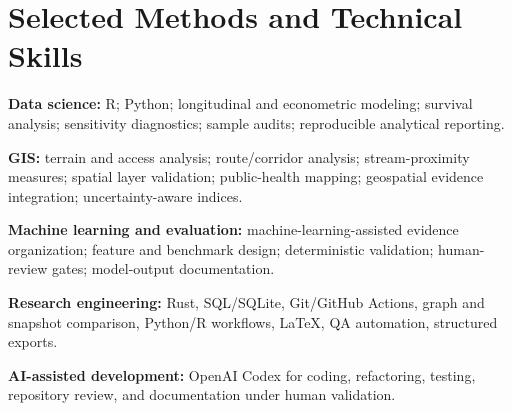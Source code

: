 \documentclass[10.5pt,letterpaper]{article}
\begin{document}
\section*{Selected Methods and Technical Skills}
\begin{cvbullets}
    \item \textbf{Data science:} R; Python; longitudinal and econometric modeling; survival analysis; sensitivity diagnostics; sample audits; reproducible analytical reporting.
    \item \textbf{GIS:} terrain and access analysis; route/corridor analysis; stream-proximity measures; spatial layer validation; public-health mapping; geospatial evidence integration; uncertainty-aware indices.
    \item \textbf{Machine learning and evaluation:} machine-learning-assisted evidence organization; feature and benchmark design; deterministic validation; human-review gates; model-output documentation.
    \item \textbf{Research engineering:} Rust, SQL/SQLite, Git/GitHub Actions, graph and snapshot comparison, Python/R workflows, LaTeX, QA automation, structured exports.
    \item \textbf{AI-assisted development:} OpenAI Codex for coding, refactoring, testing, repository review, and documentation under human validation.
\end{cvbullets}
\end{document}
